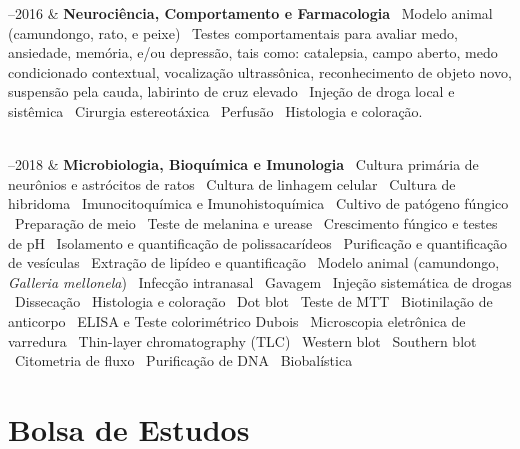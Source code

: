 \documentclass[11pt, a4paper]{article}
\newcommand{\Duration}[2]{\fontsize{10pt}{0}\selectfont #1--#2}
\begin{document}
\begin{EntriesTable}

	\Duration{2010}{2016}  &
	\textbf{Neurociência, Comportamento e Farmacologia}
	\newline
	\textbullet \ Modelo animal (camundongo, rato, e peixe)
	\textbullet \ Testes comportamentais para avaliar
	medo, ansiedade, memória, e/ou depressão,
	tais como: catalepsia, campo aberto, medo condicionado contextual,
	vocalização ultrassônica, reconhecimento de objeto novo, suspensão pela
	cauda, labirinto de cruz elevado
	\textbullet \ Injeção de droga local e sistêmica
	\textbullet \ Cirurgia estereotáxica
	\textbullet \ Perfusão
	\textbullet \ Histologia e coloração.
   
	\\

	\Duration{2014}{2018}  &
	\textbf{Microbiologia, Bioquímica e Imunologia}
	\newline
	\textbullet \ Cultura primária de neurônios e astrócitos de ratos
	\textbullet \ Cultura de linhagem celular
	\textbullet \ Cultura de hibridoma
	\textbullet \ Imunocitoquímica e Imunohistoquímica
	\textbullet \ Cultivo de patógeno fúngico
	\textbullet \ Preparação de meio
	\textbullet \ Teste de melanina e urease
	\textbullet \ Crescimento fúngico e testes de pH
	\textbullet \ Isolamento e quantificação de polissacarídeos
	\textbullet \ Purificação e quantificação de vesículas
	\textbullet \ Extração de lipídeo e quantificação
	\textbullet \ Modelo animal (camundongo, \textit{Galleria mellonela})
	\textbullet \ Infecção intranasal
	\textbullet \ Gavagem
	\textbullet \ Injeção sistemática de drogas
	\textbullet \ Dissecação
	\textbullet \ Histologia e coloração
	\textbullet \ Dot blot
	\textbullet \ Teste de MTT
	\textbullet \ Biotinilação de anticorpo
	\textbullet \ ELISA e Teste colorimétrico Dubois
	\textbullet \ Microscopia eletrônica de varredura
	\textbullet \ Thin-layer chromatography (TLC)
	\textbullet \ Western blot
	\textbullet \ Southern blot
	\textbullet \ Citometria de fluxo
	\textbullet \ Purificação de DNA
	\textbullet \ Biobalística
	\\


\end{EntriesTable}


\section*{Bolsa de Estudos}
\end{document}
